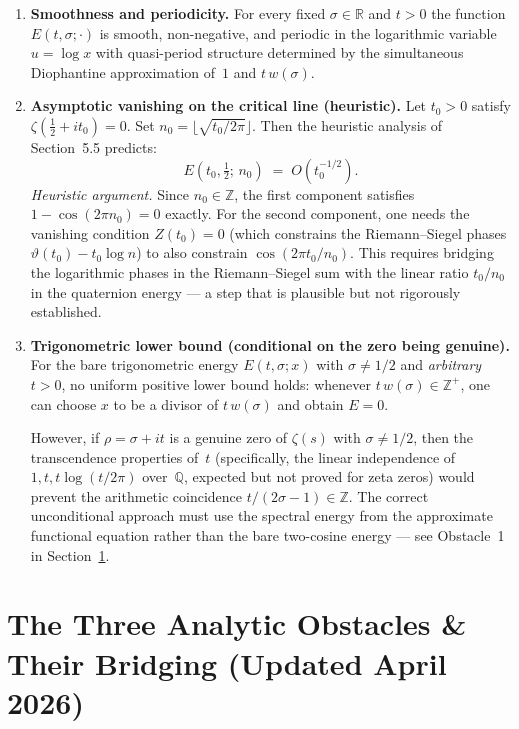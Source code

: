 \documentclass[12pt,a4paper]{article}
\newcommand{\RR}{\mathbb{R}}
\newcommand{\ZZ}{\mathbb{Z}}
\begin{document}
\begin{enumerate}[label=(\arabic*)]
\item \textbf{Smoothness and periodicity.}
For every fixed $\sigma \in \RR$ and $t > 0$ the function $E(t,\sigma;\cdot)$ is smooth, non-negative, and periodic in the logarithmic variable $u = \log x$ with quasi-period structure determined by the simultaneous Diophantine approximation of~$1$ and $t\,w(\sigma)$.

\item \textbf{Asymptotic vanishing on the critical line (heuristic).}
Let $t_0 > 0$ satisfy $\zeta(\tfrac12+it_0)=0$. Set $n_0 = \lfloor\sqrt{t_0/2\pi}\rfloor$. Then the heuristic analysis of Section~5.5 predicts:
\[
E(t_0,\tfrac12;\,n_0) \;=\; O(t_0^{-1/2}).
\]
\emph{Heuristic argument.} Since $n_0 \in \ZZ$, the first component satisfies $1 - \cos(2\pi n_0) = 0$ exactly. For the second component, one needs the vanishing condition $Z(t_0)=0$ (which constrains the Riemann--Siegel phases $\vartheta(t_0)-t_0\log n$) to also constrain $\cos(2\pi t_0/n_0)$. This requires bridging the logarithmic phases in the Riemann--Siegel sum with the linear ratio $t_0/n_0$ in the quaternion energy --- a step that is plausible but not rigorously established.

\item \textbf{Trigonometric lower bound (conditional on the zero being genuine).}
For the bare trigonometric energy $E(t,\sigma;x)$ with $\sigma \neq 1/2$ and \emph{arbitrary} $t>0$, no uniform positive lower bound holds: whenever $t\,w(\sigma) \in \ZZ^+$, one can choose $x$ to be a divisor of $t\,w(\sigma)$ and obtain $E = 0$.

However, if $\rho = \sigma+it$ is a genuine zero of $\zeta(s)$ with $\sigma \neq 1/2$, then the transcendence properties of~$t$ (specifically, the linear independence of $1, t, t\log(t/2\pi)$ over~$\mathbb{Q}$, expected but not proved for zeta zeros) would prevent the arithmetic coincidence $t/(2\sigma-1) \in \ZZ$. The correct unconditional approach must use the spectral energy from the approximate functional equation rather than the bare two-cosine energy --- see Obstacle~1 in Section~\ref{sec:obstacles}.
\end{enumerate}

\section{The Three Analytic Obstacles \& Their Bridging (Updated April 2026)}
\label{sec:obstacles}
\end{document}
